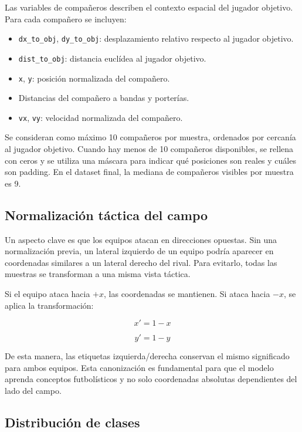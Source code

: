 Las variables de compañeros describen el contexto espacial del jugador objetivo. Para cada compañero se incluyen:

\begin{itemize}
    \item \texttt{dx\_to\_obj}, \texttt{dy\_to\_obj}: desplazamiento relativo respecto al jugador objetivo.
    \item \texttt{dist\_to\_obj}: distancia euclídea al jugador objetivo.
    \item \texttt{x}, \texttt{y}: posición normalizada del compañero.
    \item Distancias del compañero a bandas y porterías.
    \item \texttt{vx}, \texttt{vy}: velocidad normalizada del compañero.
\end{itemize}

Se consideran como máximo 10 compañeros por muestra, ordenados por cercanía al jugador objetivo. Cuando hay menos de 10 compañeros disponibles, se rellena con ceros y se utiliza una máscara para indicar qué posiciones son reales y cuáles son padding. En el dataset final, la mediana de compañeros visibles por muestra es 9.

\subsection{Normalización táctica del campo}

Un aspecto clave es que los equipos atacan en direcciones opuestas. Sin una normalización previa, un lateral izquierdo de un equipo podría aparecer en coordenadas similares a un lateral derecho del rival. Para evitarlo, todas las muestras se transforman a una misma vista táctica.

Si el equipo ataca hacia $+x$, las coordenadas se mantienen. Si ataca hacia $-x$, se aplica la transformación:

\[
x' = 1 - x
\]

\[
y' = 1 - y
\]

De esta manera, las etiquetas izquierda/derecha conservan el mismo significado para ambos equipos. Esta canonización es fundamental para que el modelo aprenda conceptos futbolísticos y no solo coordenadas absolutas dependientes del lado del campo.

\subsection{Distribución de clases}


